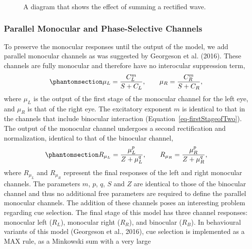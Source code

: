 \documentclass[
  12pt,
]{article}
\begin{document}
\begin{figure}


\caption{\label{fig-sumDiagram}A diagram that shows the effect of
summing a rectified wave.}

\end{figure}%

\subsubsection{Parallel Monocular and Phase-Selective
Channels}\label{parallel-monocular-and-phase-selective-channels}

To preserve the monocular responses until the output of the model, we
add parallel monocular channels as was suggested by Georgeson et al.
(2016). These channels are fully monocular and therefore have no
interocular suppression term,
\begin{equation}\phantomsection\label{eq-monocFirstStage}{
\mu_L = \frac{C_L^m}{S + C_L}, \qquad  \mu_R = \frac{C_R^m}{S + C_R},
}\end{equation} where \(\mu_L\) is the output of the first stage of the
monocular channel for the left eye, and \(\mu_R\) is that of the right
eye. The excitatory exponent \(m\) is identical to that in the channels
that include binocular interaction (Equation~\ref{eq-firstStageofTwo}).
The output of the monocular channel undergoes a second rectification and
normalization, identical to that of the binocular channel,
\begin{equation}\phantomsection\label{eq-monocSecondStage}{
R_{\mu_L} = \frac{\mu_L^p}{Z + \mu_L^q}, \qquad  R_{\mu_R} = \frac{\mu_R^p}{Z + \mu_R^q},
}\end{equation} where \(R_{\mu_L}\) and \(R_{\mu_R}\) represent the
final responses of the left and right monocular channels. The parameters
\(m\), \(p\), \(q\), \(S\) and \(Z\) are identical to those of the
binocular channel and thus no additional free parameters are required to
define the parallel monocular channels. The addition of these channels
poses an interesting problem regarding cue selection. The final stage of
this model has three channel responses: monocular left (\(R_L\)),
monocular right (\(R_R\)), and binocular (\(R_B\)). In behavioural
variants of this model (Georgeson et al., 2016), cue selection is
implemented as a MAX rule, as a Minkowski sum with a very large
\end{document}

